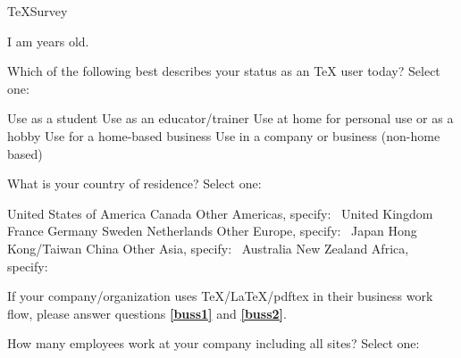 \documentclass{article}
\begin{document}
\begin{exam}{TeXSurvey}
\begin{problem}
I am \fillin{.75in}{\empty} years old.
\end{problem}

\begin{problem}
Which of the following best describes your status as
an \TeX{} user today? Select one:

\begin{answers}{1}
    \bChoices
         Use as a student\eAns
         Use as an educator/trainer\eAns
         Use at home for personal use or as a hobby\eAns
         Use for a home-based business\eAns
         Use in a company or business (non-home based)\eAns
    \eChoices
\end{answers}
\end{problem}

\begin{problem}
What is your country of residence? Select one:

\setlength\columnseprule{0pt}

\begin{multicols}{2}
\begin{answers}{1}
    \bChoices
         United States of America\eAns
         Canada\eAns
         Other Americas, \mbox{specify: \fillin{1.24in}{\empty}}\eAns
         United Kingdom\eAns
         France\eAns
         Germany\eAns
         Sweden\eAns
         Netherlands\eAns
         Other Europe, \mbox{specify: \fillin{1.25in}{\empty}}\eAns
         Japan\eAns
         Hong Kong/Taiwan\eAns
         China\eAns
         Other Asia, \mbox{specify: \fillin{1.25in}{\empty}}\eAns
         Australia\eAns
         New Zealand\eAns
         Africa, \mbox{specify: \fillin{1.25in}{\empty}}\eAns
    \eChoices
\end{answers}
\end{multicols}
\end{problem}

\def\myDing{}

\begin{eqComments}[]%
\myDing If your company/organization uses \TeX/\LaTeX/\textsf{pdftex} in their business work flow,
please answer questions \textbf{\textcolor{blue}{\ref*{buss1}}} and \textbf{\textcolor{blue}{\ref*{buss2}}}.
\end{eqComments}

\begin{problem}\label{buss1}
How many employees work at your company including all
sites? Select one:


\end{problem}
\end{exam}
\end{document}

